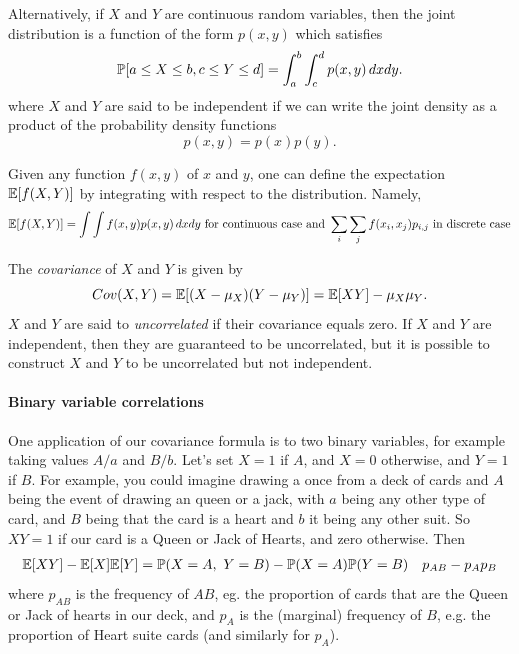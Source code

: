 Alternatively, if $X$ and $Y$ are continuous random variables, then the joint distribution is a function of the form $p(x,y)$ which satisfies 
\begin{equation}
\P[a\le X\le b, c\le Y\le d]= \int_a^b \int_c^d p(x,y)\,dxdy. 
\end{equation}
where $X$ and $Y$ are said to be independent if we can write the
joint density as a product of the probability density functions 
\begin{equation}
p(x,y) = p(x) p(y).
\end{equation}

Given any function $f(x,y)$ of $x$ and $y$, one can define the expectation $\E[f(X,Y)]$ by integrating with respect to the distribution. Namely, 
\begin{equation}
\E[f(X,Y)]=\int \int f(x,y)p(x,y)\,dxdy \mbox{ for continuous case and } \sum_i \sum_j f(x_i,x_j) p_{i,j} \mbox{ in discrete case}
\end{equation}

The \emph{covariance} of  $X$ and $Y$ is given by 
\begin{equation}
Cov(X,Y) = \E[(X-\mu_X)(Y-\mu_Y)]=\E[XY]-\mu_X\mu_Y. \label{eqn:def_covar}
\end{equation}
$X$ and $Y$ are said to \emph{uncorrelated} if their covariance equals
zero. If $X$ and $Y$ are independent, then they are guaranteed to be
uncorrelated, but it is possible to construct $X$ and $Y$ to be
uncorrelated but not independent. 


\paragraph{Binary variable correlations}
One application of our covariance formula is to two binary variables,
for example taking values $A/a$ and $B/b$. Let's set $X=1$ if $A$, and
$X=0$ otherwise, and $Y=1$ if $B$.  For example, you could imagine drawing
a once from a deck of cards and $A$ being the event of drawing an
queen or a jack, with $a$ being any other type of card, and $B$ being that the card is
a heart and $b$ it being any other suit. So $XY=1$ if our card is a
Queen or Jack of Hearts, and zero otherwise. Then
\begin{eqnarray}
  \E[XY] - \E[X]\E[Y] &= \P(X=A,~Y=B) -  \P(X=A) \P(Y=B)
                        & p_{AB} - p_{A} p_{B} \label{eqn:binary_covar}
 \end{eqnarray}
where $p_{AB}$ is the frequency of $AB$, eg. the proportion of cards
that are the Queen or Jack of hearts in our deck, and $p_{A}$ is the
(marginal) frequency of $B$, e.g. the proportion of Heart suite cards
(and similarly for $p_{A}$).

